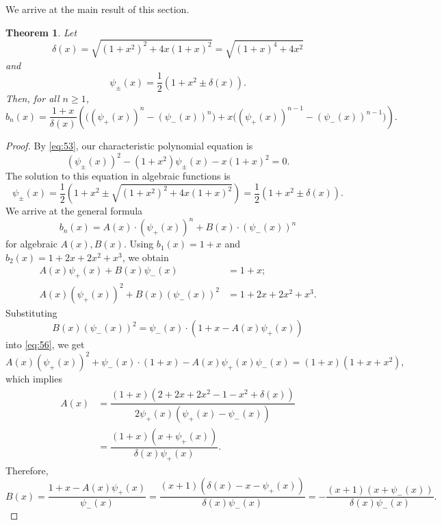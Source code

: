 \documentclass[12pt]{amsart}
\newtheorem{theorem}{Theorem}[section]
\theoremstyle{definition}
\begin{document}
We arrive at the main result of this section.

\begin{theorem}\label{CharacteristicPolynomialForm}
    Let \[\delta(x)= \sqrt{(1+x^2)^2 + 4x(1+x)^2} = \sqrt{(1+x)^4 + 4x^2}\]
    and
    \begin{equation}\label{eq:54}
    \psi_{\pm}(x) = \dfrac{1}{2}\left(1+x^2 \pm \delta(x)\right).
    \end{equation} 
   Then, for all $n\ge 1$, \[b_n(x) =\frac{1+x}{\delta(x)}\left(\big((\psi_+(x))^n-(\psi_-(x))^n\big)+x\big((\psi_+(x))^{n-1}-(\psi_-(x))^{n-1}\big)\right).\]
\end{theorem}

\begin{proof}
    By \eqref{eq:53}, our characteristic polynomial equation is 
    \begin{equation}\label{eq:55bis}
    (\psi_{\pm}(x))^2 - (1+x^2)\psi_{\pm}(x) - x(1+x)^2 = 0.
    \end{equation}
    The solution to this equation in algebraic functions is 
    \[ 
    \psi_{\pm}(x) = \dfrac{1}{2}\left(1+x^2 \pm \sqrt{(1+x^2)^2 + 4 x(1+x)^2} \right) = \dfrac{1}{2}(1+x^2 \pm \delta(x)).
    \] 
    We arrive at the general formula 
    \begin{equation}\label{eq:55}
    b_{n}(x) = A(x)\cdot (\psi_+(x))^n + B(x) \cdot (\psi_-(x))^n
    \end{equation}
    for algebraic $A(x),B(x)$. Using $b_1(x) = 1+x$ and $b_2(x) = 1+2x+2x^2+x^3$, we obtain 
    \begin{align}
    A(x)\psi_+(x) + B(x) \psi_-(x) & = 1+x;\\
    A(x) (\psi_+(x))^2 + B(x) (\psi_-(x))^2 &= 1+2x+2x^2 + x^3.\label{eq:56}
    \end{align}
    Substituting 
    \[
    B(x) (\psi_-(x))^2 = \psi_-(x)\cdot (1+x - A(x) \psi_+(x))
    \]
    into \eqref{eq:56}, we get 
    \[
    A(x)(\psi_+(x))^2 + \psi_-(x)\cdot (1+x) - A(x) \psi_+(x) \psi_-(x) = (1+x)(1+x+x^2),
    \]
    which implies
    \begin{align*}
    A(x) &= \dfrac{ (1+x)(2+2x+2x^2 - 1 - x^2 + \delta(x)) }{2\psi_+(x) (\psi_+(x) - \psi_-(x))}\\ 
    &=\dfrac{(1+x)(x + \psi_+(x)) }{\delta(x) \psi_+(x)}.
    \end{align*}
    Therefore,
    \[
    B(x) = \dfrac{1+x - A(x) \psi_+(x)}{\psi_-(x)} = \dfrac{(x+1) ( \delta(x) - x - \psi_+(x))}{\delta(x) \psi_-(x)}= -\dfrac{(x+1)(x + \psi_-(x))}{\delta(x) \psi_-(x)}.
    \] 
\end{proof}
\end{document}

